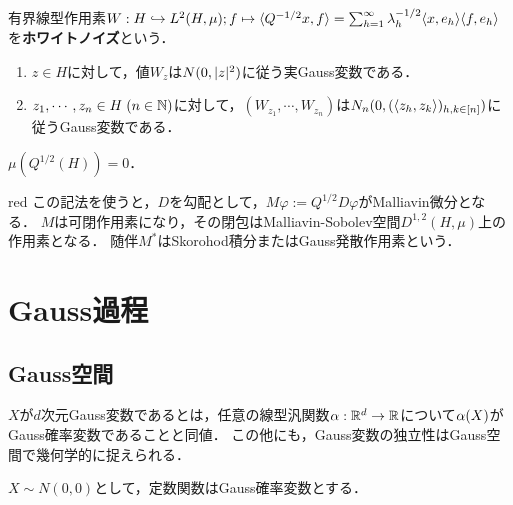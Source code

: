 \documentclass[uplatex,dvipdfmx]{jsreport}
\begin{document}
\begin{definition}\label{def-white-noise-1}
    有界線型作用素$W:H\hookrightarrow L^2(H,\mu);f\mapsto \langle Q^{-1/2}x,f\rangle=\sum_{h=1}^\infty\lambda_h^{-1/2}\langle x,e_h\rangle\langle f,e_h\rangle$
    を\textbf{ホワイトノイズ}という．
\end{definition}

\begin{proposition}\mbox{}
    \begin{enumerate}
        \item $z\in H$に対して，値$W_z$は$N(0,\lvert z\rvert^2)$に従う実Gauss変数である．
        \item $z_1,\cdots,z_n\in H\;(n\in\mathbb{N})$に対して，$(W_{z_1},\cdots,W_{z_n})$は$N_n(0,(\langle z_h,z_k\rangle)_{h,k\in[n]})$に従うGauss変数である．
    \end{enumerate}
\end{proposition}

\begin{proposition}
    $\mu(Q^{1/2}(H))=0$．
\end{proposition}

\begin{tbox}{red}{}
    この記法を使うと，$D$を勾配として，$M\varphi:=Q^{1/2}D\varphi$がMalliavin微分となる．
    $M$は可閉作用素になり，その閉包はMalliavin-Sobolev空間$D^{1,2}(H,\mu)$上の作用素となる．
    随伴$M^*$はSkorohod積分またはGauss発散作用素という．
\end{tbox}

\section{Gauss過程}

\subsection{Gauss空間}

\begin{tcolorbox}[colframe=ForestGreen, colback=ForestGreen!10!white,breakable,colbacktitle=ForestGreen!40!white,coltitle=black,fonttitle=\bfseries\sffamily,
title=]
    $X$が$d$次元Gauss変数であるとは，任意の線型汎関数$\alpha:\mathbb{R}^d\to\mathbb{R}$について$\alpha(X)$がGauss確率変数であることと同値．
    この他にも，Gauss変数の独立性はGauss空間で幾何学的に捉えられる．
\end{tcolorbox}

\begin{notation}
    $X\sim N(0,0)$として，定数関数はGauss確率変数とする．
\end{notation}
\end{document}
